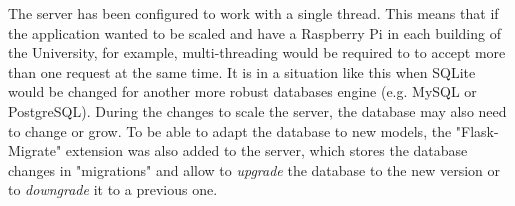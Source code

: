 The server has been configured to work with a single thread. This means that if the application wanted to be scaled and have a Raspberry Pi in each building of the University, for example, multi-threading would be required to to accept more than one request at the same time. It is in a situation like this when SQLite would be changed for another more robust databases engine (e.g. MySQL or PostgreSQL). During the changes to scale the server, the database may also need to change or grow. To be able to adapt the database to new models, the "Flask-Migrate" extension was also added to the server, which stores the database changes in "migrations" and allow to \textit{upgrade} the database to the new version or to \textit{downgrade} it to a previous one.




